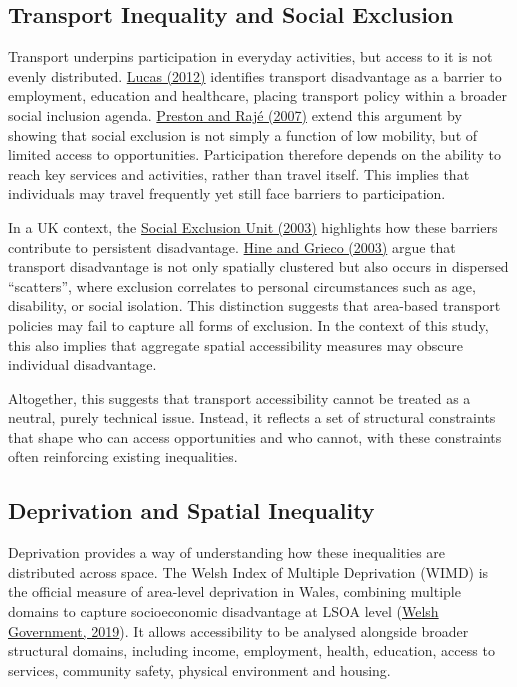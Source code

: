 \documentclass[11pt,a4paper]{article}
\newcommand{\hcite}[2]{\hyperlink{#1}{#2}}
\newcommand{\hcite}[2]{\hyperlink{#1}{#2}}
\begin{document}
\subsection{Transport Inequality and Social Exclusion}

Transport underpins participation in everyday activities, but access to it is not evenly distributed. \hcite{lucas2012}{Lucas (2012)} identifies transport disadvantage as a barrier to employment, education and healthcare, placing transport policy within a broader social inclusion agenda. \hcite{preston2007}{Preston and Rajé (2007)} extend this argument by showing that social exclusion is not simply a function of low mobility, but of limited access to opportunities. Participation therefore depends on the ability to reach key services and activities, rather than travel itself. This implies that individuals may travel frequently yet still face barriers to participation.

In a UK context, the \hcite{socialexclusion2003}{Social Exclusion Unit (2003)} highlights how these barriers contribute to persistent disadvantage. \hcite{hine2003}{Hine and Grieco (2003)} argue that transport disadvantage is not only spatially clustered but also occurs in dispersed ``scatters'', where exclusion correlates to personal circumstances such as age, disability, or social isolation. This distinction suggests that area-based transport policies may fail to capture all forms of exclusion. In the context of this study, this also implies that aggregate spatial accessibility measures may obscure individual disadvantage.

Altogether, this suggests that transport accessibility cannot be treated as a neutral, purely technical issue. Instead, it reflects a set of structural constraints that shape who can access opportunities and who cannot, with these constraints often reinforcing existing inequalities.

\subsection{Deprivation and Spatial Inequality}

Deprivation provides a way of understanding how these inequalities are distributed across space. The Welsh Index of Multiple Deprivation (WIMD) is the official measure of area-level deprivation in Wales, combining multiple domains to capture socioeconomic disadvantage at LSOA level (\hcite{welshgov2019}{Welsh Government, 2019}). It allows accessibility to be analysed alongside broader structural domains, including income, employment, health, education, access to services, community safety, physical environment and housing.
\end{document}
